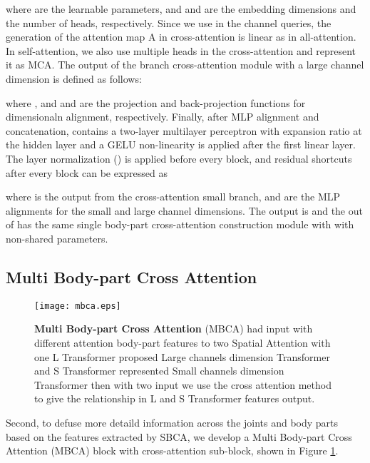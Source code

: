 \documentclass{bmvc2k}
\begin{document}
where  are the learnable parameters, and  and  are the embedding dimensions and the number of heads, respectively.
Since we use  in the channel queries, the generation of the attention map A in cross-attention is linear as in all-attention. In self-attention, we also use multiple heads in the cross-attention and represent it as MCA. The output  of the branch cross-attention module with a large channel dimension is defined as follows:

where , and  and  are the projection and back-projection functions for dimensionaln alignment, respectively. Finally, after MLP alignment and concatenation,  contains a two-layer multilayer perceptron with expansion ratio  at the hidden layer and a GELU non-linearity is applied after the first linear layer. The layer normalization () is applied before every block, and residual shortcuts after every block can be expressed as

where  is the output from the cross-attention small branch,  and  are the MLP alignments for the small and large channel dimensions.
The output is  and the out of  has the same single body-part cross-attention construction module with  with non-shared parameters.



\subsection{Multi Body-part Cross Attention}

\begin{figure}[t]
\begin{center}
   \texttt{[image: mbca.eps]}
\end{center}
   \caption{\textbf{Multi Body-part Cross Attention} (MBCA) had input with different attention body-part features to two Spatial Attention with one L Transformer proposed Large channels dimension Transformer and S Transformer represented Small channels dimension Transformer then with two input we use the cross attention method to give the relationship in L and S Transformer features output.}
\label{fig-mbca}
\end{figure}

Second, to defuse more detaild information across the joints and body parts based on the features extracted by SBCA, we develop a Multi Body-part Cross Attention (MBCA) block with cross-attention sub-block, shown in Figure \ref{fig-mbca}.
\end{document}

